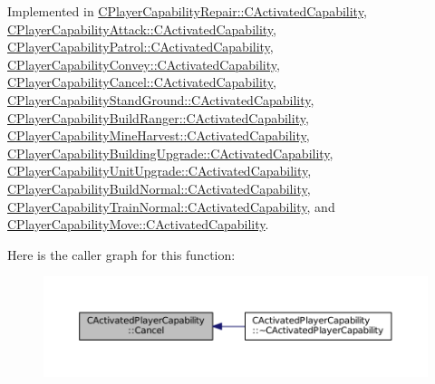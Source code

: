 Implemented in \hyperlink{classCPlayerCapabilityRepair_1_1CActivatedCapability_a719cee3446291470987f504739f63215}{C\+Player\+Capability\+Repair\+::\+C\+Activated\+Capability}, \hyperlink{classCPlayerCapabilityAttack_1_1CActivatedCapability_a0796fbda8a35b60a2320becfdf2b5c13}{C\+Player\+Capability\+Attack\+::\+C\+Activated\+Capability}, \hyperlink{classCPlayerCapabilityPatrol_1_1CActivatedCapability_a36165c232eb283ce4a92bd4606480c73}{C\+Player\+Capability\+Patrol\+::\+C\+Activated\+Capability}, \hyperlink{classCPlayerCapabilityConvey_1_1CActivatedCapability_ad84a94a1ae3647ea160e262a0154e229}{C\+Player\+Capability\+Convey\+::\+C\+Activated\+Capability}, \hyperlink{classCPlayerCapabilityCancel_1_1CActivatedCapability_accd67b449574b6c99e21f522d13bc96a}{C\+Player\+Capability\+Cancel\+::\+C\+Activated\+Capability}, \hyperlink{classCPlayerCapabilityStandGround_1_1CActivatedCapability_ac75cd8a26726adb60cf045f99059ca7d}{C\+Player\+Capability\+Stand\+Ground\+::\+C\+Activated\+Capability}, \hyperlink{classCPlayerCapabilityBuildRanger_1_1CActivatedCapability_a46a5240502d6a8de65d3d56bbda8bf91}{C\+Player\+Capability\+Build\+Ranger\+::\+C\+Activated\+Capability}, \hyperlink{classCPlayerCapabilityMineHarvest_1_1CActivatedCapability_ab1fef064fbc085a6419b5a822e787614}{C\+Player\+Capability\+Mine\+Harvest\+::\+C\+Activated\+Capability}, \hyperlink{classCPlayerCapabilityBuildingUpgrade_1_1CActivatedCapability_adca97e7f7611f4adfcfea615428dac0b}{C\+Player\+Capability\+Building\+Upgrade\+::\+C\+Activated\+Capability}, \hyperlink{classCPlayerCapabilityUnitUpgrade_1_1CActivatedCapability_a29b41666081cf420e9f3b7d93c09920b}{C\+Player\+Capability\+Unit\+Upgrade\+::\+C\+Activated\+Capability}, \hyperlink{classCPlayerCapabilityBuildNormal_1_1CActivatedCapability_a7cc74f98f4071edfa75395d02d897fef}{C\+Player\+Capability\+Build\+Normal\+::\+C\+Activated\+Capability}, \hyperlink{classCPlayerCapabilityTrainNormal_1_1CActivatedCapability_a028dc1f8c528cc726737d712f0236884}{C\+Player\+Capability\+Train\+Normal\+::\+C\+Activated\+Capability}, and \hyperlink{classCPlayerCapabilityMove_1_1CActivatedCapability_a6fe1e26646bd14e94ebf7abd0a41cdd3}{C\+Player\+Capability\+Move\+::\+C\+Activated\+Capability}.

Here is the caller graph for this function\+:\nopagebreak
\begin{figure}[H]
\begin{center}
\leavevmode
\includegraphics[width=350pt]{classCActivatedPlayerCapability_a5cde83be468e262ad054d81e28684a81_icgraph}
\end{center}
\end{figure}
\hypertarget{classCActivatedPlayerCapability_a943b5999a57504399293250382c0ec6a}{}\label{classCActivatedPlayerCapability_a943b5999a57504399293250382c0ec6a} 
